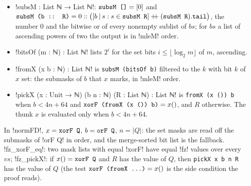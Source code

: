 \begin{definition}\label{def:lean-pathsum-pickx}
\begin{itemize}
\item \lean!subsM : List ℕ → List ℕ!: $\textnormal{\texttt{subsM []}}=[0]$ and
  $\textnormal{\texttt{subsM (b :: R)}} = 0 :: \bigl([b\mathbin{|}s : s\in\textnormal{\texttt{subsM R}}]\mathbin{+\!\!+}(\textnormal{\texttt{subsM R}}).\textnormal{\texttt{tail}}\bigr)$,
  the number $0$ and the bitwise or of every nonempty sublist of $bs$; for $bs$ a list of
  ascending powers of two the output is in \lean!mleM! order.
\item \lean!bitsOf (m : ℕ) : List ℕ! lists $2^i$ for the set bits $i\le\lfloor\log_2 m\rfloor$ of $m$,
  ascending.
\item \lean!fromX (x b : ℕ) : List ℕ! is \textnormal{\texttt{subsM (bitsOf b)}} filtered to the $k$ with bit
  $k$ of $x$ set: the submasks of $b$ that $x$ marks, in \lean!mleM! order.
\item \lean!pickX (x : Unit → ℕ) (b n : ℕ) (R : List ℕ) : List ℕ! is \textnormal{\texttt{fromX (x ()) b}}
  when $b<4n+64$ and $\textnormal{\texttt{xorF (fromX (x ()) b)}} = x()$, and $R$ otherwise. The thunk $x$ is
  evaluated only when $b<4n+64$.
\end{itemize}
In \lean!normFD!, $x=\textnormal{\texttt{xorF Q}}$, $b=\textnormal{\texttt{orF Q}}$, $n=|Q|$: the set masks are
read off the submasks of \lean!orF Q! in order, and the merge-sorted bit list is the fallback.
\lean!fz_xorF_eq!: two mask lists with equal \lean!xorF! have equal \lean!fz! values over every
$vs$; \lean!fz_pickX!: if $x()=\textnormal{\texttt{xorF Q}}$ and $R$ has the value of $Q$, then
\textnormal{\texttt{pickX x b n R}} has the value of $Q$ (the test $\textnormal{\texttt{xorF (fromX \ldots)}} = x()$
is the side condition the proof reads).
\end{definition}

